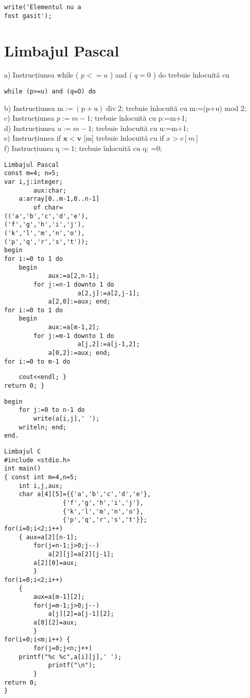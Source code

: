 \begin{verbatim}
write('Elementul nu a
fost gasit');
\end{verbatim}

\section*{Limbajul Pascal}
a) Instrucțiunea while ( $p<=u$ ) and ( $q=0$ ) do trebuie înlocuită cu

\begin{verbatim}
while (p>=u) and (q=O) do
\end{verbatim}

b) Instrucțiunea $\mathrm{m}:=(\mathrm{p}+\mathrm{u}) \operatorname{div} 2$; trebuie înlocuită cu m:=(p+u) mod 2;\\
c) Instrucțiunea $p:=m-1$; trebuie înlocuită cu p:=m+1;\\
d) Instrucțiunea $u:=m-1$; trebuie înlocuită cu u:=m+1;\\
e) Instrucțiunea if $\mathbf{x}<\mathbf{v}$ [m] trebuie înlocuită cu if $x>v[m]$\\
f) Instrucțiunea $\mathrm{q}:=1$; trebuie înlocuită cu q: =0;

\begin{verbatim}
Limbajul Pascal
const m=4; n=5;
var i,j:integer;
        aux:char;
    a:array[0..m-1,0..n-1]
        of char=
(('a','b','c','d','e'),
('f','g','h','i','j'),
('k','l','m','n','o'),
('p','q','r','s','t'));
begin
for i:=0 to 1 do
    begin
            aux:=a[2,n-1];
        for j:=n-1 downto 1 do
                    a[2,j]:=a[2,j-1];
            a[2,0]:=aux; end;
for i:=0 to 1 do
    begin
            aux:=a[m-1,2];
        for j:=m-1 downto 1 do
                    a[j,2]:=a[j-1,2];
            a[0,2]:=aux; end;
for i:=0 to m-1 do
\end{verbatim}

\begin{verbatim}
    cout<<endl; }
return 0; }
\end{verbatim}

\begin{verbatim}
begin
    for j:=0 to n-1 do
        write(a[i,j],' ');
    writeln; end;
end.
\end{verbatim}

\begin{verbatim}
Limbajul C
#include <stdio.h>
int main()
{ const int m=4,n=5;
    int i,j,aux;
    char a[4][5]={{'a','b','c','d','e'},
                {'f','g','h','i','j'},
                {'k','l','m','n','o'},
                {'p','q','r','s','t'}};
for(i=0;i<2;i++)
    { aux=a[2][n-1];
        for(j=n-1;j>0;j--)
            a[2][j]=a[2][j-1];
        a[2][0]=aux;
        }
for(i=0;i<2;i++)
    {
        aux=a[m-1][2];
        for(j=m-1;j>0;j--)
            a[j][2]=a[j-1][2];
        a[0][2]=aux;
        }
for(i=0;i<m;i++) {
        for(j=0;j<n;j++)
    printf("%c %c",a[i][j],' ');
            printf("\n");
        }
return 0;
}
\end{verbatim}

